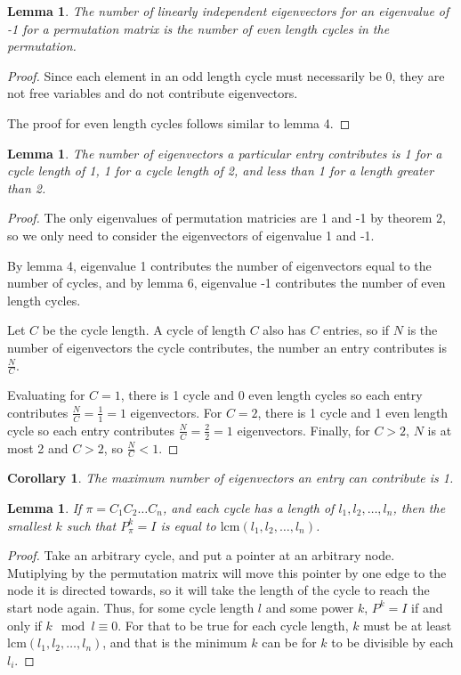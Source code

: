 \documentclass[11pt, oneside]{article}
\theoremstyle{plain}
\newtheorem{corollary}{Corollary}[theorem]
\newtheorem{lemma}[theorem]{Lemma}
\theoremstyle{definition}
\begin{document}
\begin{lemma}
The number of linearly independent eigenvectors for an eigenvalue of -1 for a permutation matrix
is the number of even length cycles in the permutation.
\end{lemma}

\begin{proof}
Since each element in an odd length cycle must necessarily be 0,
they are not free variables and do not contribute eigenvectors.

The proof for even length cycles follows similar to lemma 4.
\end{proof}

\begin{lemma}
The number of eigenvectors a particular entry contributes is 1 for a cycle length of 1,
1 for a cycle length of 2, and less than 1 for a length greater than 2.
\end{lemma}
\begin{proof}
The only eigenvalues of permutation matricies are 1 and -1 by theorem 2,
so we only need to consider the eigenvectors of eigenvalue 1 and -1.

By lemma 4, eigenvalue 1 contributes the number of eigenvectors equal to
the number of cycles, and by lemma 6, eigenvalue -1 contributes the
number of even length cycles.

Let \( C \) be the cycle length. A cycle of length \( C \) also has \( C \)
entries, so if \( N \) is the number of eigenvectors the cycle contributes,
the number an entry contributes is \( \frac{N}{C} \).

Evaluating for \( C = 1 \), there is 1 cycle and 0 even length cycles so
each entry contributes \( \frac{N}{C} = \frac{1}{1} = 1 \) eigenvectors.
For \( C = 2 \), there is 1 cycle and 1 even length cycle so each entry
contributes \( \frac{N}{C} = \frac{2}{2} = 1 \) eigenvectors.
Finally, for \( C > 2 \), \( N \) is at most 2 and \( C > 2 \), so
\( \frac{N}{C} < 1 \).
\end{proof}

\begin{corollary}
The maximum number of eigenvectors an entry can contribute is 1.
\end{corollary}

\newpage

\begin{lemma}
If \( \pi = C_1 C_2 \ldots C_n \), and each cycle
has a length of \( l_1, l_2, \ldots, l_n \),
then the smallest \( k \) such that \( P_{\pi}^k = I \)
is equal to \( \mathrm{lcm }(l_1, l_2, \ldots, l_n) \).
\end{lemma}
\begin{proof}
Take an arbitrary cycle, and put a pointer at an arbitrary node. Mutiplying
by the permutation matrix will move this pointer by one edge to the node
it is directed towards, so it will take the length of the cycle to
reach the start node again. Thus, for some cycle length \( l \) and some power \( k \),
\( P^k = I \) if and only if \( k \mod l \equiv 0 \). For that to be true for each
cycle length, \( k \) must be at least \( \mathrm{lcm }(l_1, l_2, \ldots, l_n) \),
and that is the minimum \( k \) can be for \( k \) to be divisible by each \( l_i \).
\end{proof}
\end{document}
